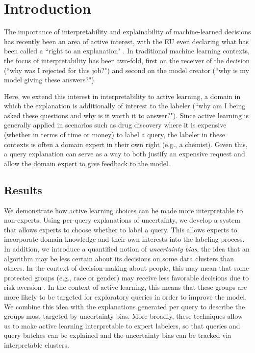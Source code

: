 \section{Introduction}
The importance of interpretability and explainability of machine-learned decisions has recently been an area of active interest, with the EU even declaring what has been called a ``right to an explanation" \cite{EUexplanationright}.  In traditional machine learning contexts, the focus of interpretability has been two-fold, first on the receiver of the decision (``why was I rejected for this job?") and second on the model creator (``why is my model giving these answers?").

Here, we extend this interest in interpretability to active learning, a domain in which the explanation is additionally of interest to the labeler (``why am I being asked these questions and why is it worth it to answer?").  Since active learning is generally applied in scenarios such as drug discovery where it is expensive (whether in terms of time or money) to label a query, the labeler in these contexts is often a domain expert in their own right (e.g., a chemist).  Given this, a query explanation can serve as a way to both justify an expensive request and allow the domain expert to give feedback to the model.

\subsection{Results}
We demonstrate how active learning choices can be made more interpretable to non-experts.  Using per-query explanations of uncertainty, we develop a system that allows experts to choose whether to label a query.  This allows experts to incorporate domain knowledge and their own interests into the labeling process.  In addition, we introduce a quantified notion of \emph{uncertainty bias}, the idea that an algorithm may be less certain about its decisions on some data clusters than others.  In the context of decision-making about people, this may mean that some protected groups (e.g., race or gender) may receive less favorable decisions due to risk aversion \cite{EUexplanationright}.  In the context of active learning, this means that these groups are more likely to be targeted for exploratory queries in order to improve the model.  We combine this idea with the explanations generated per query to describe the groups most targeted by uncertainty bias.  More broadly, these techniques allow us to make active learning interpretable to expert labelers, so that queries and query batches can be explained and the uncertainty bias can be tracked via interpretable clusters.

